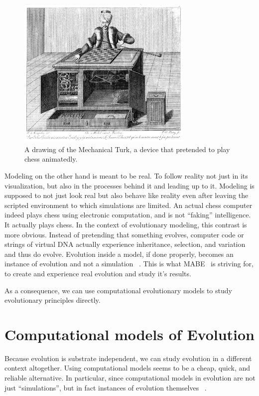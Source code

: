 \documentclass[12pt,oneside,listof=totoc,paper=a4,headings=small]{scrbook}
\begin{document}
\begin{figure}[h!]
\centering
\includegraphics[width=0.75\textwidth,height=0.75\textheight,keepaspectratio]{images/Tuerkischer_schachspieler_windisch4.jpg}
\caption{A drawing of the Mechanical Turk, a device that pretended to play chess animatedly.~\cite{mechTurk}}
\label{fig:mechanica_turk}
\end{figure}

Modeling on the other hand is meant to be real. To follow reality not just in its visualization, but also in the processes behind it and leading up to it. Modeling is supposed to not just look real but also behave like reality even after leaving the scripted environment to which simulations are limited. An actual chess computer indeed plays chess using electronic computation, and is not ``faking'' intelligence. It actually plays chess. In the context of evolutionary modeling, this contrast is more obvious. Instead of pretending that something evolves, computer code or strings of virtual DNA actually experience inheritance, selection, and variation and thus do evolve. Evolution inside a model, if done properly, becomes an instance of evolution and not a simulation ~\cite{Pennock:2007iy}. This is what MABE~\cite{bohm2017mabe,MABE2016} is striving for, to create and experience real evolution and study it's results.

As a consequence, we can use computational evolutionary models to study evolutionary principles directly. 

\chapter{Computational models of Evolution}
Because evolution is substrate independent, we can study evolution in a different context altogether. Using computational models seems to be a cheap, quick, and reliable alternative. In particular, since computational models in evolution are not just ``simulations'', but in fact instances of evolution themselves ~\cite{Pennock:2007iy}.
\end{document}
